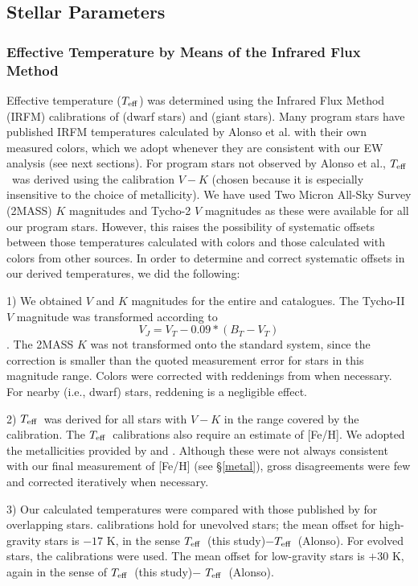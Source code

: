 \documentclass[12pt,preprint]{aastex}
\def\teff{\mbox{$T_{\rm {eff}}$}}
\begin{document}
\subsection{Stellar Parameters}
\subsubsection{Effective Temperature by Means of the Infrared Flux Method}
Effective temperature (\teff) was determined using the Infrared Flux Method (IRFM) calibrations of \citet{AlonsoDwarf} (dwarf stars) and \citet{AlonsoGiant} (giant stars).   Many program stars have published IRFM temperatures calculated by Alonso et al. with their own measured colors, which we adopt whenever they are consistent with our EW analysis (see next sections).  For program stars not observed by Alonso et al., \teff~was derived using the calibration $V-K$ (chosen because it is especially insensitive to the choice of metallicity).  We have used Two Micron All-Sky Survey (2MASS)  $K$ magnitudes and Tycho-2 $V$ magnitudes as these were available for all our program stars.  However, this raises the possibility of systematic offsets between those temperatures calculated  with \citet{AlonsoDwarf,AlonsoGiant} colors and those calculated with colors from other sources.  In order to determine and correct systematic offsets in our derived temperatures, we did the following:

1)  We  obtained $V$ and $K$ magnitudes for the entire \citet{Carney1994} and \citet{Bond1980} catalogues.  The Tycho-II $V$ magnitude was transformed according to $$V_J=V_T-0.09*(B_T-V_T)$$ \citep{tycho2}.  The 2MASS $K$ was not transformed onto the standard system, since the correction is smaller than the quoted measurement error for stars in this magnitude range.  Colors were corrected with reddenings from \citet{Twarog1994} when necessary.  For nearby (i.e., dwarf) stars, reddening is a negligible effect.  

2)  \teff~was derived for all stars with $V-K$ in the range covered by the calibration.  The \teff~calibrations also require an estimate of [Fe/H].  We adopted the metallicities provided by \citet{Carney1994} and \citet{Twarog1994}.  Although these were not always consistent with our final measurement of [Fe/H] (see \S \ref{metal}), gross disagreements were few and corrected iteratively when necessary.

3)  Our calculated temperatures  were compared with those published by \citet{AlonsoDwarf,AlonsoGiant} for overlapping stars.  \citet{AlonsoDwarf}  calibrations hold for unevolved stars; the mean offset for high-gravity stars is $-17$ K, in the sense \teff~(this study)$-$\teff~(Alonso).  For evolved stars, the \citet{AlonsoGiant} calibrations were used.  The mean offset for low-gravity stars is $+30$ K, again in the sense of \teff~(this study)$-$ \teff~(Alonso).
\end{document}
